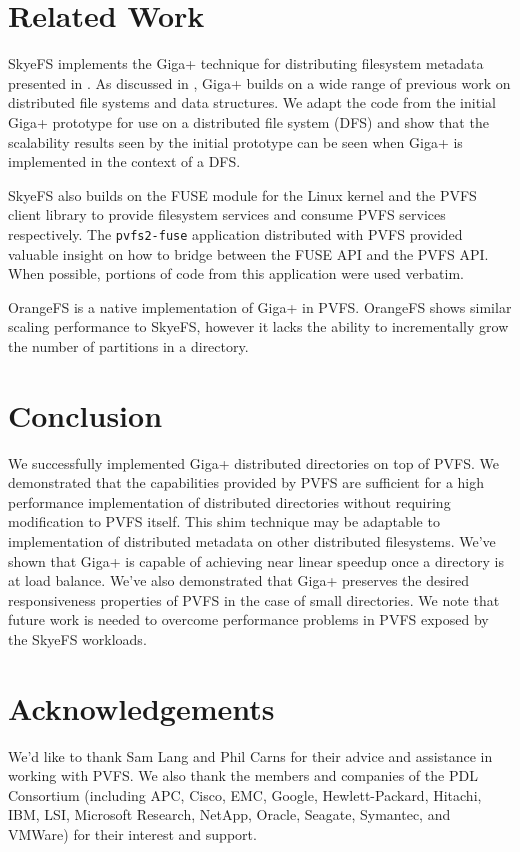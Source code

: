 \documentclass[twocolumn,letterpaper]{article}
\newcommand{\code}[1]{\texttt{#1}}
\begin{document}
\section{Related Work}
SkyeFS implements the Giga+ technique for distributing filesystem metadata
presented in \cite{gigaplus}.  As discussed in \cite{gigaplus}, Giga+ builds
on a wide range of previous work on distributed file systems and data
structures.  We adapt the code from the initial Giga+ prototype for use on a
distributed file system (DFS) and show that the scalability results seen by
the initial prototype can be seen when Giga+ is implemented in the context of
a DFS.

SkyeFS also builds on the FUSE module for the Linux kernel and the PVFS client
library to provide filesystem services and consume PVFS services respectively.
The \code{pvfs2-fuse} application distributed with PVFS provided valuable
insight on how to bridge between the FUSE API and the PVFS API.  When
possible, portions of code from this application were used verbatim.

OrangeFS is a native implementation of Giga+ in PVFS.\cite{orange}  OrangeFS
shows similar scaling performance to SkyeFS, however it lacks the ability to
incrementally grow the number of partitions in a directory.

\section{Conclusion}
We successfully implemented Giga+ distributed directories on top of PVFS.  We
demonstrated that the capabilities provided by PVFS are sufficient for a high
performance implementation of distributed directories without requiring
modification to PVFS itself.  This shim technique may be adaptable to
implementation of distributed metadata on other distributed filesystems.
We've shown that Giga+ is capable of achieving near linear speedup once a
directory is at load balance.  We've also demonstrated that Giga+ preserves
the desired responsiveness properties of PVFS in the case of small
directories.  We note that future work is needed to overcome performance
problems in PVFS exposed by the SkyeFS workloads.

\section*{Acknowledgements}
We'd like to thank Sam Lang and Phil Carns for their advice and assistance in
working with PVFS.  We also thank the members and companies of the PDL
Consortium (including APC, Cisco, EMC, Google, Hewlett-Packard, Hitachi, IBM,
LSI, Microsoft Research, NetApp, Oracle, Seagate, Symantec, and VMWare) for
their interest and support.
\end{document}
